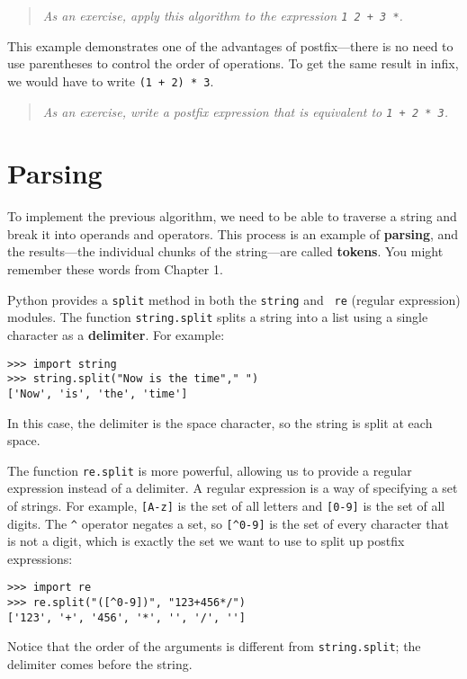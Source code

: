 \begin{quote}
{\em As an exercise, apply this algorithm to the expression
{\tt 1 2 + 3 *}.}
\end{quote}

This example demonstrates one of the advantages of postfix---there is
no need to use parentheses to control the order of operations.  To get
the same result in infix, we would have to write {\tt (1 + 2) * 3}.

\begin{quote}
{\em As an exercise, write a postfix expression that is equivalent to
{\tt 1 + 2 * 3}.}
\end{quote}


\section {Parsing}

To implement the previous algorithm, we need
to be able to traverse a string and break it into operands and
operators.  This process is an example of {\bf parsing}, and the
results---the individual chunks of the string---are called {\bf
tokens}.  You might remember these words from Chapter 1.

Python provides a {\tt split} method in both the {\tt string} and {\tt
re} (regular expression) modules. The function {\tt string.split}
splits a string into a list using a single character as a {\bf delimiter}.
For example:

\beforeverb
\begin{verbatim}
>>> import string
>>> string.split("Now is the time"," ")
['Now', 'is', 'the', 'time']
\end{verbatim}
\afterverb
%
In this case, the delimiter is the space character, so the string
is split at each space.

The function {\tt re.split} is more powerful, allowing us to
provide a regular expression instead of a delimiter.
A regular expression is a way of specifying a set of strings.
For example, \verb+[A-z]+ is the set of all letters and
\verb+[0-9]+ is the set of all digits.  The \verb+^+ operator
negates a set, so \verb+[^0-9]+ is the set of every character that
is not a digit, which is exactly the set we want to use to
split up postfix expressions:

\beforeverb
\begin{verbatim}
>>> import re
>>> re.split("([^0-9])", "123+456*/")
['123', '+', '456', '*', '', '/', '']
\end{verbatim}
\afterverb
%
Notice that the order of the
arguments is different from {\tt string.split}; the delimiter comes
before the string.

